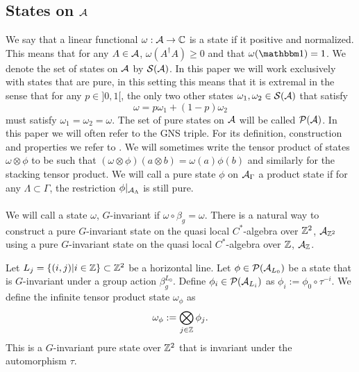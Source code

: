 \documentclass[12pt,a4paper,twoside]{article}
\numberwithin{equation}{section}
\begin{document}
\subsection{States on $\AA$}
We say that a linear functional $\omega:\AA\rightarrow \CC$ is a state if it positive and normalized. This means that for any $A\in\AA$, $\omega(A^\dagger A)\geq 0$ and that $\omega(\id)=1$. We denote the set of states on $\AA$ by $\mathcal{S}(\AA)$. In this paper we will work exclusively with states that are pure, in this setting this means that it is extremal in the sense that for any $p\in]0,1[$, the only two other states $\omega_1,\omega_2\in\mathcal{S}(\AA)$ that satisfy
\begin{equation}
	\omega=p\omega_1+(1-p)\omega_2
\end{equation}
must satisfy $\omega_1=\omega_2=\omega$. The set of pure states on $\AA$ will be called $\PP(\AA)$. In this paper we will often refer to the GNS triple. For its definition, construction and properties we refer to \cite{bratteli1979operator}. We will sometimes write the tensor product of states $\omega\otimes\phi$ to be such that $(\omega\otimes\phi)(a\otimes b)=\omega(a)\phi(b)$ and similarly for the stacking tensor product. We will call a pure state $\phi$ on $\AA_\Gamma$ a product state if for any $\Lambda\subset\Gamma$, the restriction $\phi|_{\AA_\Lambda}$ is still pure.\\\\
We will call a state $\omega$, $G$-invariant if $\omega\circ\beta_g=\omega$. There is a natural way to construct a pure $G$-invariant state on the quasi local $C^*$-algebra over $\ZZ^2$, $\AA_{\ZZ^2}$ using a pure $G$-invariant state on the quasi local $C^*$-algebra over $\ZZ$, $\AA_\ZZ$.
\begin{definition}\label{def:InfiniteTensorProduct}
	Let $L_j=\{(i,j)|i\in\ZZ\}\subset\ZZ^2$ be a horizontal line. Let $\phi\in\PP(\AA_{L_0})$ be a state that is $G$-invariant under a group action $\beta_g^{L_0}$. Define $\phi_i\in\PP(\AA_{L_i})$ as $\phi_i:=\phi_0\circ\tau^{-i}$. We define the infinite tensor product state $\omega_\phi$ as
	\begin{equation}
		\omega_\phi:=\bigotimes_{j\in\ZZ}\phi_j.
	\end{equation}
	This is a $G$-invariant pure state over $\ZZ^2$ that is invariant under the automorphism $\tau$.
\end{definition}
\end{document}
